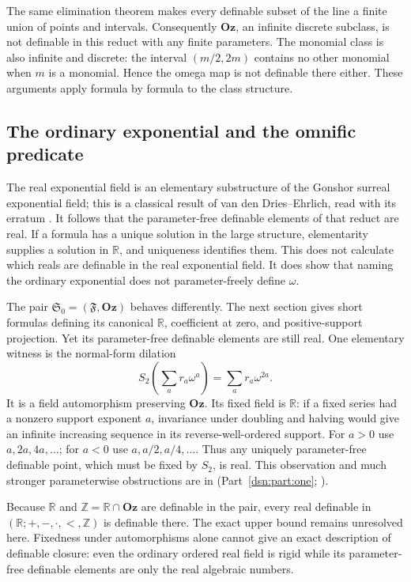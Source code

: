 \documentclass[11pt,a4paper]{article}
\numberwithin{equation}{section}
\theoremstyle{definition}
\theoremstyle{remark}
\newcommand{\Oz}{\mathbf{Oz}}
\newcommand{\Z}{\mathbb Z}
\newcommand{\R}{\mathbb R}
\newcommand{\Szero}{\mathfrak S_0}
\begin{document}
The same elimination theorem makes every definable subset of the line
a finite union of points and intervals.  Consequently \(\Oz\), an
infinite discrete subclass, is not definable in this reduct with any
finite parameters.  The monomial class is also infinite and discrete:
the interval \((m/2,2m)\) contains no other monomial when \(m\) is a
monomial.  Hence the omega map is not definable there either.  These
arguments apply formula by formula to the class structure.

\subsection{The ordinary exponential and the omnific predicate}

The real exponential field is an elementary substructure of the
Gonshor surreal exponential field; this is a classical result of
van den Dries--Ehrlich, read with its erratum \cite{vdDE,vdDEerr}.
It follows that the parameter-free definable elements of that reduct
are real.  If a formula has a unique solution in the large structure,
elementarity supplies a solution in \(\R\), and uniqueness identifies
them.  This does not calculate which reals are definable in the real
exponential field.  It does show that naming the ordinary exponential
does not parameter-freely define \(\omega\).

The pair \(\Szero=(\mathfrak F,\Oz)\) behaves differently.  The next
section gives short formulas defining its canonical \(\R\), coefficient
at zero, and positive-support projection.  Yet its parameter-free
definable elements are still real.  One elementary witness is the
normal-form dilation
\[
 S_2\left(\sum_a r_a\omega^a\right)=\sum_a r_a\omega^{2a}.
\]
It is a field automorphism preserving \(\Oz\).  Its fixed field is
\(\R\): if a fixed series had a nonzero support exponent \(a\), invariance
under doubling and halving would give an infinite increasing sequence
in its reverse-well-ordered support.  For \(a>0\) use
\(a,2a,4a,\ldots\); for \(a<0\) use
\(a,a/2,a/4,\ldots\).  Thus any uniquely parameter-free definable point,
which must be fixed by \(S_2\), is real.  This observation and much
stronger parameterwise obstructions are in (Part~\ref{dsn:part:one}; \cite{RepoOpa}).

Because \(\R\) and \(\Z=\R\cap\Oz\) are definable in the pair, every
real definable in \((\R;+,-,\cdot,<,\Z)\) is definable there.  The exact
upper bound remains unresolved here.  Fixedness under automorphisms
alone cannot give an exact description of definable closure: even the
ordinary ordered real field is rigid while its parameter-free
definable elements are only the real algebraic numbers.
\end{document}
